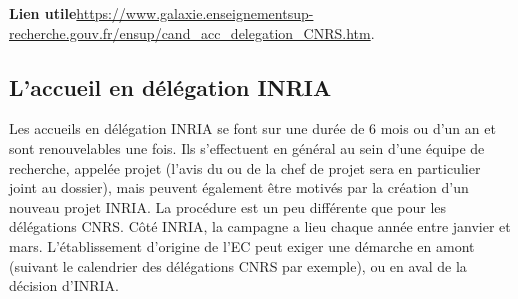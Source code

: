 \textbf{Lien utile\hspace{0.5em}}\url{https://www.galaxie.enseignementsup-recherche.gouv.fr/ensup/cand_acc_delegation_CNRS.htm}.
% 
%
%
%
\subsection*{L'accueil en d\'el\'egation INRIA}


Les accueils en d\'el\'egation INRIA se font sur une dur\'ee de 6 mois ou
d'un an et sont renouvelables une fois. Ils s'effectuent en
g\'en\'eral au sein d'une \'equipe de recherche, appel\'ee projet
(l'avis du ou de la chef de projet sera en particulier joint au dossier),
mais peuvent \'egalement \^etre motiv\'es par la cr\'eation d'un
nouveau projet INRIA. La proc\'edure est un peu diff\'erente que
pour les d\'el\'egations CNRS. C\^ot\'e INRIA, la campagne a lieu chaque ann\'ee entre janvier et mars.
L'\'etablissement d'origine de l'EC peut exiger une d\'emarche en amont (suivant le calendrier des d\'el\'egations CNRS par exemple), 
ou en aval de la d\'ecision d'INRIA.

